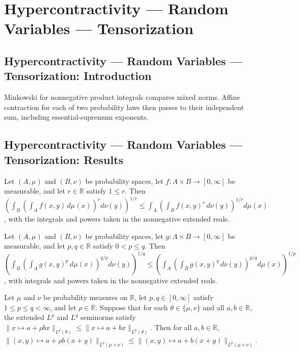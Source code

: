 \section{Hypercontractivity --- Random Variables --- Tensorization}
\subsection*{Hypercontractivity --- Random Variables --- Tensorization: Introduction}
Minkowski for nonnegative product integrals compares mixed norms. Affine contraction for each of two probability laws then passes to their independent sum, including essential-supremum exponents.

\subsection*{Hypercontractivity --- Random Variables --- Tensorization: Results}

\begin{theorem}
\leanok
{}
Let $(A,\mu)$ and $(B,\nu)$ be probability spaces, let $f:A\times B\to[0,\infty]$ be
measurable, and let $r\in\mathbb R$ satisfy $1\le r$. Then $\left(\int_B\left(\int_A
f(x,y)\,d\mu(x)\right)^r d\nu(y)\right)^{1/r}\le\int_A\left(\int_B
f(x,y)^r\,d\nu(y)\right)^{1/r}d\mu(x)$, with the integrals and powers taken in the
nonnegative extended reals.
\end{theorem}

\begin{theorem}
\leanok
{}
Let $(A,\mu)$ and $(B,\nu)$ be probability spaces, let $g:A\times B\to[0,\infty]$ be
measurable, and let $p,q\in\mathbb R$ satisfy $0<p\le q$. Then $\left(\int_B\left(\int_A
g(x,y)^p\,d\mu(x)\right)^{q/p}d\nu(y)\right)^{1/q}\le\left(\int_A\left(\int_B
g(x,y)^q\,d\nu(y)\right)^{p/q}d\mu(x)\right)^{1/p}$, with integrals and powers taken in
the nonnegative extended reals.
\end{theorem}

\begin{theorem}
\leanok
{}
Let $\mu$ and $\nu$ be probability measures on $\mathbb R$, let $p,q\in[0,\infty]$
satisfy $1\le p\le q<\infty$, and let $\rho\in\mathbb R$. Suppose that for each
$\theta\in\{\mu,\nu\}$ and all $a,b\in\mathbb R$, the extended $L^p$ and $L^q$ seminorms
satisfy $\|x\mapsto a+\rho bx\|_{L^q(\theta)}\le\|x\mapsto a+bx\|_{L^p(\theta)}$. Then
for all $a,b\in\mathbb R$, $\|(x,y)\mapsto a+\rho
b(x+y)\|_{L^q(\mu\times\nu)}\le\|(x,y)\mapsto a+b(x+y)\|_{L^p(\mu\times\nu)}$.
\end{theorem}

